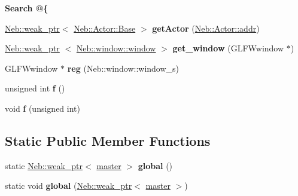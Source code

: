 \begin{Indent}{\bf \-Search @\{}\par
\begin{DoxyCompactItemize}
\item 
\hypertarget{classNeb_1_1master_a5e904cfb101128c317df8ae8909a76d0}{\hyperlink{classNeb_1_1weak__ptr}{\-Neb\-::weak\-\_\-ptr}$<$ \hyperlink{classNeb_1_1Actor_1_1Base}{\-Neb\-::\-Actor\-::\-Base} $>$ {\bfseries get\-Actor} (\hyperlink{classNeb_1_1Actor_1_1addr}{\-Neb\-::\-Actor\-::addr})}\label{classNeb_1_1master_a5e904cfb101128c317df8ae8909a76d0}

\item 
\hypertarget{classNeb_1_1master_a52f234f4ba1485910dc1590f7e0b8c33}{\hyperlink{classNeb_1_1weak__ptr}{\-Neb\-::weak\-\_\-ptr}\*
$<$ \hyperlink{classNeb_1_1window_1_1window}{\-Neb\-::window\-::window} $>$ {\bfseries get\-\_\-window} (\-G\-L\-F\-Wwindow $\ast$)}\label{classNeb_1_1master_a52f234f4ba1485910dc1590f7e0b8c33}

\item 
\hypertarget{classNeb_1_1master_a6548ef5ff871fec6dc28d3b3fa44c159}{\-G\-L\-F\-Wwindow $\ast$ {\bfseries reg} (\-Neb\-::window\-::window\-\_\-s)}\label{classNeb_1_1master_a6548ef5ff871fec6dc28d3b3fa44c159}

\item 
\hypertarget{classNeb_1_1master_a82a824658ee217959a57b230aa2231a7}{unsigned int {\bfseries f} ()}\label{classNeb_1_1master_a82a824658ee217959a57b230aa2231a7}

\item 
\hypertarget{classNeb_1_1master_aae9419e976bd48f05bbb86d820d30b95}{void {\bfseries f} (unsigned int)}\label{classNeb_1_1master_aae9419e976bd48f05bbb86d820d30b95}

\end{DoxyCompactItemize}
\end{Indent}
\subsection*{\-Static \-Public \-Member \-Functions}
\begin{DoxyCompactItemize}
\item 
\hypertarget{classNeb_1_1master_a7537ce2190a19fc5aa7d3cc505c33ad2}{static \hyperlink{classNeb_1_1weak__ptr}{\-Neb\-::weak\-\_\-ptr}$<$ \hyperlink{classNeb_1_1master}{master} $>$ {\bfseries global} ()}\label{classNeb_1_1master_a7537ce2190a19fc5aa7d3cc505c33ad2}

\item 
\hypertarget{classNeb_1_1master_a649f1435a3b08187a071f5759b5695b4}{static void {\bfseries global} (\hyperlink{classNeb_1_1weak__ptr}{\-Neb\-::weak\-\_\-ptr}$<$ \hyperlink{classNeb_1_1master}{master} $>$)}\label{classNeb_1_1master_a649f1435a3b08187a071f5759b5695b4}

\end{DoxyCompactItemize}

